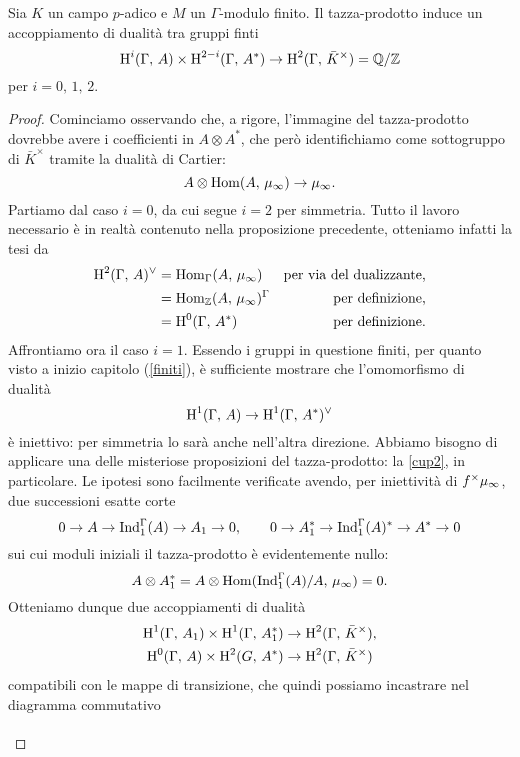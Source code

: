 \begin{theorem}
	Sia $ K $ un campo $ p $-adico e $ M $ un $ \Gamma $-modulo finito. Il tazza-prodotto induce un accoppiamento di dualità tra gruppi finti
	\[ \operatorname{H}^i(\Gamma, \, A) \times \operatorname{H}^{2-i}(\Gamma, \, A^*) \to \operatorname{H}^2(\Gamma, \, \bar{K}^\times) = \mathbb{Q} / \mathbb{Z} \]
	per $ i = 0, \, 1, \, 2 $.
\end{theorem}
\begin{proof}
	Cominciamo osservando che, a rigore, l'immagine del tazza-prodotto dovrebbe avere i coefficienti in $ A \otimes A^* $, che però identifichiamo come sottogruppo di $ \bar{K}^\times $ tramite la dualità di Cartier:
	\[ A \otimes \operatorname{Hom}(A,\, \mu_\infty) \to \mu_\infty. \]
	Partiamo dal caso $ i = 0 $, da cui segue $ i = 2 $ per simmetria. Tutto il lavoro necessario è in realtà contenuto nella proposizione precedente, otteniamo infatti la tesi da
	\begin{align*}
	\operatorname{H}^2(\Gamma, \, A)^\vee & = \operatorname{Hom}_\Gamma(A, \, \mu_\infty) & \text{per via del dualizzante,} \\
	& = \operatorname{Hom}_{\mathbb{Z}}(A, \, \mu_\infty)^\Gamma & \text{per definizione,} \\
	& = \operatorname{H}^0(\Gamma, \, A^*) & \text{per definizione.}
	\end{align*}
	Affrontiamo ora il caso $ i = 1 $. Essendo i gruppi in questione finiti, per quanto visto a inizio capitolo (\ref{finiti}), è sufficiente mostrare che l'omomorfismo di dualità
	\[ \operatorname{H}^1(\Gamma, \, A) \to \operatorname{H}^1(\Gamma, \, A^*)^\vee \]
	è iniettivo: per simmetria lo sarà anche nell'altra direzione. Abbiamo bisogno di applicare una delle misteriose proposizioni del tazza-prodotto: la \ref{cup2}, in particolare. Le ipotesi sono facilmente verificate avendo, per iniettività di $ f^\times\mu_\infty $, due successioni esatte corte
	\[ 0 \to A \to \operatorname{Ind}_1^\Gamma(A) \to A_1 \to 0, \qquad 0 \to A_1^* \to \operatorname{Ind}_1^\Gamma(A)^* \to A^* \to 0 \]
	sui cui moduli iniziali il tazza-prodotto è evidentemente nullo:
	\[ A \otimes A_1^* = A \otimes \operatorname{Hom}(\operatorname{Ind}_1^\Gamma(A)/A, \, \mu_\infty) = 0. \]
	Otteniamo dunque due accoppiamenti di dualità 
	\begin{align*}
	\operatorname{H}^{1}(\Gamma, \, A_1) \times \operatorname{H}^{1}(\Gamma, \, A_1^*) &\to \operatorname{H}^{2}(\Gamma, \, \bar{K}^\times),\\
	\operatorname{H}^{0}(\Gamma, \, A) \times \operatorname{H}^{2}(G, \, A^*) &\to \operatorname{H}^{2}(\Gamma, \, \bar{K}^\times)
	\end{align*}
	compatibili con le mappe di transizione, che quindi possiamo incastrare nel diagramma commutativo
	\[\begin{tikzcd}[column sep = small]

\end{tikzcd}\]
\end{proof}
